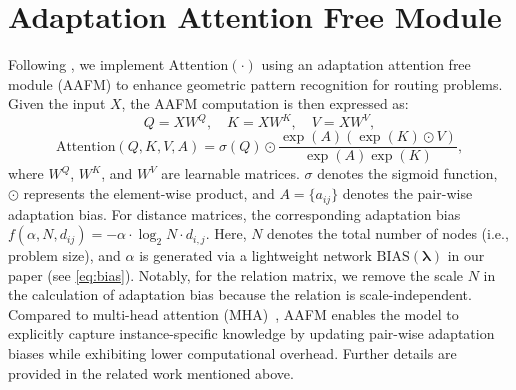 \documentclass{article}
\theoremstyle{plain}
\theoremstyle{definition}
\theoremstyle{remark}
\begin{document}
\section{Adaptation Attention Free Module}
\label{append:aafm}
Following \citet{zhou2024icam}, we implement $\mathrm{Attention}(\cdot)$ using an adaptation attention free module (AAFM) to enhance geometric pattern recognition for routing problems. Given the input $X$, the AAFM computation is then expressed as:
\begin{equation}
Q = XW^{Q}, \quad K = XW^{K}, \quad V = XW^{V},
\label{eq:qkv}
\end{equation}
\begin{equation}
\mathrm{Attention}(Q,K,V,A) = \sigma (Q) \odot \frac{\exp (A) (\exp (K) \odot V)}{\exp (A)\exp (K)},
\label{eq:AAFM}
\end{equation}
where $W^{Q}$, $W^{K}$, and $W^{V}$ are learnable matrices. $\sigma$ denotes the sigmoid function, $\odot$ represents the element-wise product, and $A = \{a_{ij}\}$ denotes the pair-wise adaptation bias. For distance matrices, the corresponding adaptation bias $f\left(\alpha,N,d_{ij}\right)=-\alpha\cdot\log_2{N}\cdot d_{i,j}$. Here, $N$ denotes the total number of nodes (i.e., problem size), and $\alpha$ is generated via a lightweight network $\mathrm{BIAS}(\bm{\lambda})$ in our paper (see \cref{eq:bias}). Notably, for the relation matrix, we remove the scale $N$ in the calculation of adaptation bias because the relation is scale-independent. Compared to multi-head attention (MHA)~\citep{vaswani2017attention}, AAFM enables the model to explicitly capture instance-specific knowledge by updating pair-wise adaptation biases while exhibiting lower computational overhead. Further details are provided in the related work mentioned above. 
\end{document}
